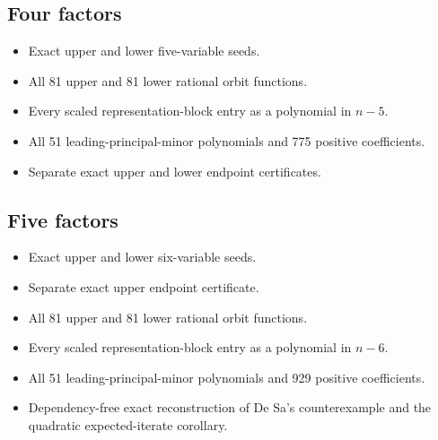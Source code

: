 \documentclass[11pt]{article}
\begin{document}
\subsection*{Four factors}
\begin{itemize}
\item {}\par
Exact upper and lower five-variable seeds.
\item {}\par
All 81 upper and 81 lower rational orbit functions.
\item {}\par
Every scaled representation-block entry as a polynomial in \(n-5\).
\item {}\par
All 51 leading-principal-minor polynomials and 775 positive coefficients.
\item {}\par
Separate exact upper and lower endpoint certificates.
\end{itemize}

\subsection*{Five factors}
\begin{itemize}
\item {}\par
Exact upper and lower six-variable seeds.
\item {}\par
Separate exact upper endpoint certificate.
\item {}\par
All 81 upper and 81 lower rational orbit functions.
\item {}\par
Every scaled representation-block entry as a polynomial in \(n-6\).
\item {}\par
All 51 leading-principal-minor polynomials and 929 positive coefficients.
\item {}\par
Dependency-free exact reconstruction of De Sa's counterexample and the
quadratic expected-iterate corollary.
\end{itemize}
\end{document}

